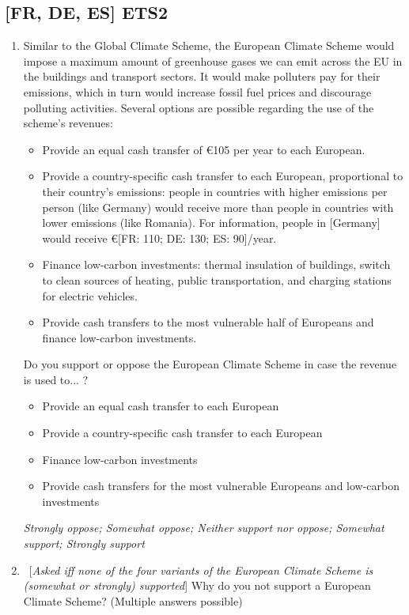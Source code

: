 \documentclass[12pt,english]{article}
\begin{document}
\subsection*{[FR, DE, ES] ETS2}
\begin{enumerate}[resume] 
    \item Similar to the Global Climate Scheme, the European Climate Scheme would impose a maximum amount of greenhouse gases we can emit across the EU in the buildings and transport sectors. It would make polluters pay for their emissions, which in turn would increase fossil fuel prices and discourage polluting activities. Several options are possible regarding the use of the scheme's revenues:
    \begin{itemize}
        \item Provide an equal cash transfer of \euro{}105 per year to each European.
        \item Provide a country-specific cash transfer to each European, proportional to their country's emissions: people in countries with higher emissions per person (like Germany) would receive more than people in countries with lower emissions (like Romania). For information, people in [Germany] would receive \euro{}[FR: 110; DE: 130; ES: 90]/year.
        \item Finance low-carbon investments: thermal insulation of buildings, switch to clean sources of heating, public transportation, and charging stations for electric vehicles.
        \item Provide cash transfers to the most vulnerable half of Europeans and finance low-carbon investments. 
    \end{itemize}     	 	 	 
    Do you support or oppose the European Climate Scheme in case the revenue is used to... ?
    \begin{itemize}
        \item Provide an equal cash transfer to each European 
        \item Provide a country-specific cash transfer to each European 
        \item Finance low-carbon investments 
        \item Provide cash transfers for the most vulnerable Europeans and low-carbon investments 
    \end{itemize}
    \textit{Strongly oppose; Somewhat oppose; Neither support nor oppose; Somewhat support; Strongly support}
    \item ~[\textit{Asked iff none of the four variants of the European Climate Scheme is (somewhat or strongly) supported}] Why do you not support a European Climate Scheme? (Multiple answers possible)

\end{enumerate}
\end{document}
